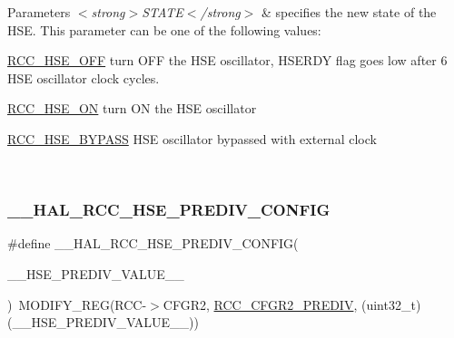 \begin{DoxyParams}{Parameters}
{\em $<$strong$>$\+S\+T\+A\+T\+E$<$/strong$>$} & specifies the new state of the H\+SE. This parameter can be one of the following values\+: \begin{DoxyItemize}
\item \hyperlink{group___r_c_c___h_s_e___config_ga1616626d23fbce440398578855df6f97}{R\+C\+C\+\_\+\+H\+S\+E\+\_\+\+O\+FF} turn O\+FF the H\+SE oscillator, H\+S\+E\+R\+DY flag goes low after 6 H\+SE oscillator clock cycles. \item \hyperlink{group___r_c_c___h_s_e___config_gabc4f70a44776c557af20496b04d9a9db}{R\+C\+C\+\_\+\+H\+S\+E\+\_\+\+ON} turn ON the H\+SE oscillator \item \hyperlink{group___r_c_c___h_s_e___config_ga5ca515db2d5c4d5bdb9ee3d154df2704}{R\+C\+C\+\_\+\+H\+S\+E\+\_\+\+B\+Y\+P\+A\+SS} H\+SE oscillator bypassed with external clock \end{DoxyItemize}
\\
\hline
\end{DoxyParams}
\mbox{\label{group___r_c_c___h_s_e___configuration_gafc6bfe4fd172ea49871172fa137b60e0}} 
\subsubsection{\texorpdfstring{\+\_\+\+\_\+\+H\+A\+L\+\_\+\+R\+C\+C\+\_\+\+H\+S\+E\+\_\+\+P\+R\+E\+D\+I\+V\+\_\+\+C\+O\+N\+F\+IG}{\_\_HAL\_RCC\_HSE\_PREDIV\_CONFIG}}
{\footnotesize\ttfamily \#define \+\_\+\+\_\+\+H\+A\+L\+\_\+\+R\+C\+C\+\_\+\+H\+S\+E\+\_\+\+P\+R\+E\+D\+I\+V\+\_\+\+C\+O\+N\+F\+IG(\begin{DoxyParamCaption}\item[{}]{\+\_\+\+\_\+\+H\+S\+E\+\_\+\+P\+R\+E\+D\+I\+V\+\_\+\+V\+A\+L\+U\+E\+\_\+\+\_\+ }\end{DoxyParamCaption})~M\+O\+D\+I\+F\+Y\+\_\+\+R\+EG(R\+CC-\/$>$C\+F\+G\+R2, \hyperlink{group___peripheral___registers___bits___definition_ga022892b6d0e4ee671b82e7f6552b0074}{R\+C\+C\+\_\+\+C\+F\+G\+R2\+\_\+\+P\+R\+E\+D\+IV}, (uint32\+\_\+t)(\+\_\+\+\_\+\+H\+S\+E\+\_\+\+P\+R\+E\+D\+I\+V\+\_\+\+V\+A\+L\+U\+E\+\_\+\+\_\+))}



